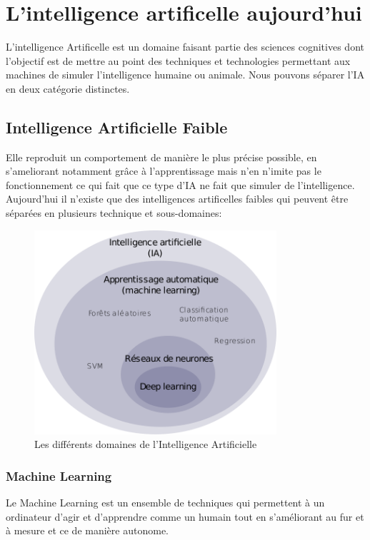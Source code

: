 \chapter{L'intelligence artificelle aujourd'hui}
L'intelligence Artificelle est un domaine faisant partie 
des sciences cognitives dont l'objectif est de mettre au
point des techniques et technologies permettant aux 
machines de simuler l'intelligence humaine ou animale.
Nous pouvons séparer l'IA en deux catégorie distinctes. 

\section{Intelligence Artificielle Faible}
Elle reproduit un comportement de manière le plus précise possible,
en s'ameliorant notamment grâce à l'apprentissage 
mais n'en n'imite pas le fonctionnement ce qui fait que
ce type d'IA ne fait que simuler de l'intelligence. \newline
Aujourd'hui il n'existe que des intelligences artificelles faibles qui peuvent  
être séparées en plusieurs technique et sous-domaines: \newline

\begin{figure}[!h]
    \centering
    \includegraphics[width=0.8\textwidth]{Images/aitype}
    \caption{Les différents domaines de l'Intelligence Artificielle}
	\label{fig:DiffDomaineIA}
\end{figure}
\newpage

\subsection{Machine Learning}
Le Machine Learning est un ensemble de techniques qui permettent à un ordinateur 
d'agir et d'apprendre comme un humain tout en s'améliorant au fur et 
à mesure et ce de manière autonome. \newline


